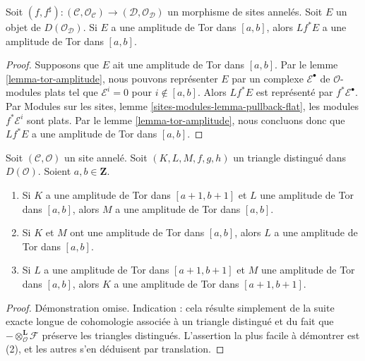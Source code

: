 \begin{lemma}
\label{lemma-tor-amplitude-pullback}
Soit $(f, f^\sharp) : (\mathcal{C}, \mathcal{O}_\mathcal{C}) \to
(\mathcal{D}, \mathcal{O}_\mathcal{D})$
un morphisme de sites annelés. Soit $E$ un objet de
$D(\mathcal{O}_\mathcal{D})$. Si $E$ a une amplitude de Tor dans $[a, b]$,
alors $Lf^*E$ a une amplitude de Tor dans $[a, b]$.
\end{lemma}

\begin{proof}
Supposons que $E$ ait une amplitude de Tor dans $[a, b]$. Par le lemme
\ref{lemma-tor-amplitude}, nous pouvons représenter $E$ par un complexe
$\mathcal{E}^\bullet$ de $\mathcal{O}$-modules plats tel que
$\mathcal{E}^i = 0$ pour $i \not \in [a, b]$. Alors $Lf^*E$ est représenté
par $f^*\mathcal{E}^\bullet$. Par Modules sur les sites, lemme
\ref{sites-modules-lemma-pullback-flat}, les modules
$f^*\mathcal{E}^i$ sont plats. Par le lemme \ref{lemma-tor-amplitude}, nous
concluons donc que $Lf^*E$ a une amplitude de Tor dans $[a, b]$.
\end{proof}

\begin{lemma}
\label{lemma-cone-tor-amplitude}
Soit $(\mathcal{C}, \mathcal{O})$ un site annelé. Soit
$(K, L, M, f, g, h)$ un triangle distingué dans $D(\mathcal{O})$.
Soient $a, b \in \mathbf{Z}$.
\begin{enumerate}
\item Si $K$ a une amplitude de Tor dans $[a + 1, b + 1]$ et $L$ une
amplitude de Tor dans $[a, b]$, alors $M$ a une amplitude de Tor dans
$[a, b]$.
\item Si $K$ et $M$ ont une amplitude de Tor dans $[a, b]$, alors $L$ a une
amplitude de Tor dans $[a, b]$.
\item Si $L$ a une amplitude de Tor dans $[a + 1, b + 1]$ et $M$ une
amplitude de Tor dans $[a, b]$, alors $K$ a une amplitude de Tor dans
$[a + 1, b + 1]$.
\end{enumerate}
\end{lemma}

\begin{proof}
Démonstration omise. Indication : cela résulte simplement de la suite exacte
longue de cohomologie associée à un triangle distingué et du fait que
$- \otimes_\mathcal{O}^{\mathbf{L}} \mathcal{F}$
préserve les triangles distingués. L'assertion la plus facile à démontrer est
(2), et les autres s'en déduisent par translation.
\end{proof}

